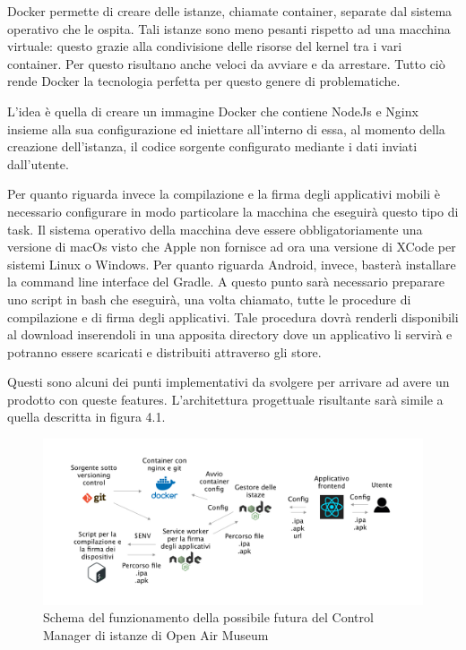  Docker permette di creare delle istanze, chiamate container, separate dal sistema operativo che le ospita. Tali istanze sono meno pesanti rispetto ad una macchina virtuale: questo grazie alla condivisione delle risorse del kernel tra i vari container. Per questo risultano anche veloci da avviare e da arrestare. Tutto ciò rende Docker la tecnologia perfetta per questo genere di problematiche.\vspace{5mm}
 
L’idea è quella di creare un immagine Docker che contiene NodeJs e Nginx insieme alla sua configurazione ed iniettare all’interno di essa, al momento della creazione dell’istanza, il codice sorgente configurato mediante i dati inviati dall’utente.\vspace{5mm}

Per quanto riguarda invece la compilazione e la firma degli applicativi mobili è necessario configurare in modo particolare la macchina che eseguirà questo tipo di task. Il sistema operativo della macchina deve essere obbligatoriamente una versione di macOs visto che Apple non fornisce ad ora una versione di XCode per sistemi Linux o Windows. Per quanto riguarda Android, invece, basterà installare la command line interface del Gradle. A questo punto sarà necessario preparare uno script in bash che eseguirà, una volta chiamato, tutte le procedure di compilazione e di firma degli applicativi. Tale procedura dovrà renderli disponibili al download inserendoli in una apposita directory dove un applicativo li servirà e potranno essere scaricati e distribuiti attraverso gli store.\vspace{5mm}

Questi sono alcuni dei punti implementativi da svolgere per arrivare ad avere un prodotto con queste features. L’architettura progettuale risultante sarà simile a quella descritta in figura 4.1.\vspace{5mm}

\begin{figure}[h]
\centering
\includegraphics[width=1\textwidth]{images/schemaIstanzeAlakai.png}
\caption{Schema del funzionamento della possibile futura del Control Manager di istanze di Open Air Museum}
\end{figure}


